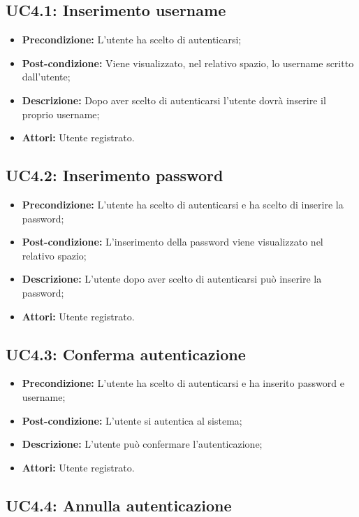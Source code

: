 \subsection{ UC4.1: Inserimento username}

\begin{itemize}
	\item \textbf{Precondizione:} L'utente ha scelto di autenticarsi;
	\item \textbf{Post-condizione:} Viene visualizzato, nel relativo spazio, lo username scritto dall'utente;
	\item \textbf{Descrizione:} Dopo aver scelto di autenticarsi l'utente dovrà inserire il proprio username;
	\item \textbf{Attori:} Utente registrato.
\end{itemize}
\subsection{ UC4.2: Inserimento password}

\begin{itemize}
	\item \textbf{Precondizione:} L'utente ha scelto di autenticarsi e ha scelto di inserire la password;
	\item \textbf{Post-condizione:} L'inserimento della password viene visualizzato nel relativo spazio;
	\item \textbf{Descrizione:} L'utente dopo aver scelto di autenticarsi può inserire la password;
	\item \textbf{Attori:} Utente registrato.
\end{itemize}
\subsection{ UC4.3: Conferma autenticazione}

\begin{itemize}
	\item \textbf{Precondizione:} L'utente ha scelto di autenticarsi e ha inserito password e username;
	\item \textbf{Post-condizione:} L'utente si autentica al sistema;
	\item \textbf{Descrizione:} L'utente può confermare l'autenticazione;
	\item \textbf{Attori:} Utente registrato.
\end{itemize}
\subsection{ UC4.4: Annulla autenticazione}

